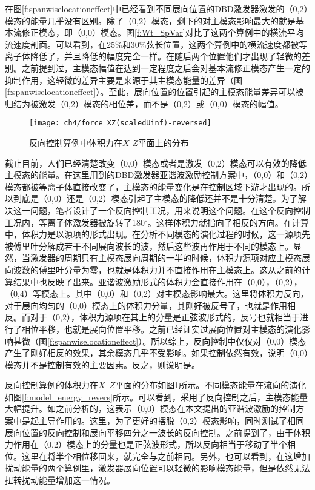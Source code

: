 在图\ref{f:spanwiselocationeffect}中已经看到不同展向位置的DBD激发器激发的（0,2）模态的能量几乎没有区别。除了（0,2）模态，剩下的对主模态影响最大的就是基本流修正模态，即（0,0）模态。图\ref{f:Wt_SpVar}对比了这两个算例中的横流平均流速度剖面。可以看到，在25\%和30\%弦长位置，这两个算例中的横流速度都被等离子体降低了，并且降低的幅度完全一样。在随后两个位置他们才出现了轻微的差别。之前提到过，主模态幅值在达到一定程度之后会对基本流修正模态产生一定的抑制作用，这轻微的差异主要是来源于其主模态能量的差异（图\ref{f:spanwiselocationeffect}）。至此，展向位置的位置引起的主模态能量差异可以被归结为被激发（0,2）模态的相位差，而不是（0,2）或（0,0）模态的幅值。
\begin{figure}
\centering
\texttt{[image: ch4/force\_XZ(scaledUinf)-reversed]}
\caption{反向控制算例中体积力在$X$-$Z$平面上的分布}%
\label{f:force_reversed}
\end{figure}

截止目前，人们已经清楚改变（0,0）模态\cite{dorr2016}或者是激发（0,2）模态\cite{Saric1998}可以有效的降低主模态的能量。在这里用到的DBD激发器亚谐波激励控制方案中，（0,0）和（0,2）模态都被等离子体直接改变了，主模态的能量变化是在控制区域下游才出现的。所以到底是（0,0）还是（0,2）模态引起了主模态的降低还并不是十分清楚。为了解决这一问题，笔者设计了一个反向控制工况，用来说明这个问题。在这个反向控制工况内，等离子体激发器被旋转了180$^\circ$。这样体积力就指向了相反的方向。在计算中，体积力是以源项的形式出现。在分析不同模态的演化过程的时候，这一源项先被傅里叶分解成若干不同展向波长的波，然后这些波再作用于不同的模态上。显然，当激发器的周期只有主模态展向周期的一半的时候，体积力源项对应主模态展向波数的傅里叶分量为零，也就是体积力并不直接作用在主模态上。这从之前的计算结果中也反映了出来。亚谐波激励形式的体积力会直接作用在（0,0），（0,2），（0,4）等模态上。其中（0,0）和（0,2）对主模态影响最大。这里将体积力反向，对于展向均匀的（0,0）模态上的体积力分量，其刚好被反号了，也就是作用相反。而对于（0,2），体积力源项在其上的分量是正弦波形式的，反号也就相当于进行了相位平移，也就是展向位置平移。之前已经证实过展向位置对主模态的演化影响甚微（图\ref{f:spanwiselocationeffect}）。所以综上，反向控制中仅仅对（0,0）模态产生了刚好相反的效果，其余模态几乎不受影响。如果控制依然有效，说明（0,0）模态并不是控制有效的主要因素。反之，则说明是。

反向控制算例的体积力在$X$--$Z$平面的分布如图\ref{f:force_reversed}所示。不同模态能量在流向的演化如图\ref{f:model_energy_revers}所示。可以看到，采用了反向控制之后，主模态能量大幅提升。如之前分析的，这表示（0,0）模态在本文提出的亚谐波激励的控制方案中是起主导作用的。这里，为了更好的摆脱（0,2）模态影响，同时测试了相同展向位置的反向控制和展向平移四分之一波长的反向控制。之前提到了，由于体积力作用在（0,2）模态上的分量也是正弦波形式，所以反向相当于移动了半个相位。这里在将半个相位移回来，就完全与之前相同。另外，也可以看到，在这增加扰动能量的两个算例里，激发器展向位置可以轻微的影响模态能量，但是依然无法扭转扰动能量增加这一情况。

